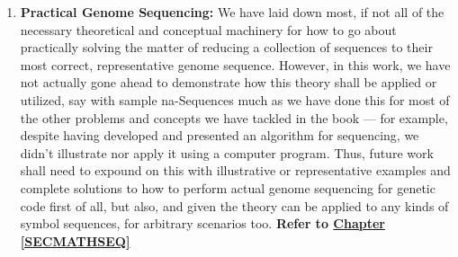 \documentclass[a4paper, 18pt]{book} %
\begin{document}
\begin{enumerate}
\item \textbf{Practical Genome Sequencing:} We have laid down most, if not all of the necessary theoretical and conceptual machinery for how to go about practically solving the matter of reducing a collection of sequences to their most correct, representative genome sequence. However, in this work, we have not actually gone ahead to demonstrate how this theory shall be applied or utilized, say with sample na-Sequences much as we have done this for most of the other problems and concepts we have tackled in the book --- for example, despite having developed and presented an algorithm for sequencing, we didn't illustrate nor apply it using a computer program. Thus, future work shall need to expound on this with illustrative or representative examples and complete solutions to how to perform actual genome sequencing for genetic code first of all, but also, and given the theory can be applied to any kinds of symbol sequences, for arbitrary scenarios too.  \textbf{Refer to \textbf{\hyperref[SECMATHSEQ]{Chapter \ref{SECMATHSEQ}}}} 


\end{enumerate}



\end{document}
